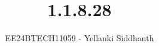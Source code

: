 \documentclass[journal]{IEEEtran}
\begin{document}

\vspace{3cm}

\title{1.1.8.28}
\author{EE24BTECH11059 - Yellanki Siddhanth
}
{\let\newpage\relax\maketitle}

\renewcommand{\thefigure}{\theenumi}
\renewcommand{\thetable}{\theenumi}
\setlength{\intextsep}{10pt} %


\renewcommand{\thetable}{\theenumi}
\end{document}
